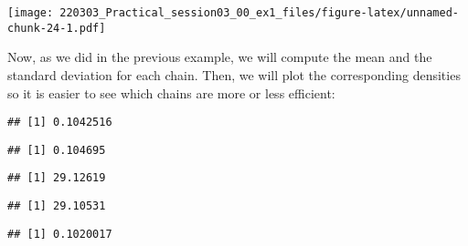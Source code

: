 \documentclass[
]{article}
\newenvironment{Shaded}{\begin{snugshade}}{\end{snugshade}}
\newcommand{\CommentTok}[1]{\textcolor[rgb]{0.56,0.35,0.01}{\textit{#1}}}
\newcommand{\FunctionTok}[1]{\textcolor[rgb]{0.00,0.00,0.00}{#1}}
\newcommand{\NormalTok}[1]{#1}
\newcommand{\SpecialCharTok}[1]{\textcolor[rgb]{0.00,0.00,0.00}{#1}}
\begin{document}
\texttt{[image: 220303\_Practical\_session03\_00\_ex1\_files/figure-latex/unnamed-chunk-24-1.pdf]}

Now, as we did in the previous example, we will compute the mean and the
standard deviation for each chain. Then, we will plot the corresponding
densities so it is easier to see which chains are more or less
efficient:

\begin{Shaded}
\end{Shaded}

\begin{verbatim}
## [1] 0.1042516
\end{verbatim}

\begin{verbatim}
## [1] 0.104695
\end{verbatim}

\begin{Shaded}
\end{Shaded}

\begin{verbatim}
## [1] 29.12619
\end{verbatim}

\begin{verbatim}
## [1] 29.10531
\end{verbatim}

\begin{Shaded}
\end{Shaded}

\begin{verbatim}
## [1] 0.1020017
\end{verbatim}
\end{document}
